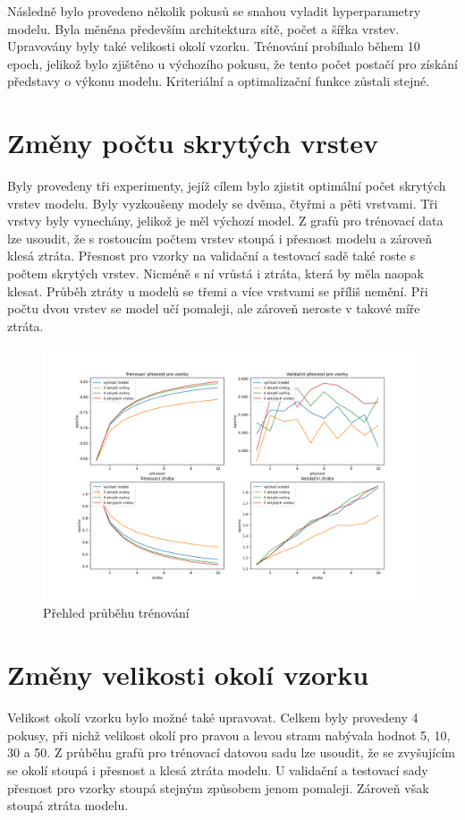 \documentclass[FM,BP]{tulthesis}
\begin{document}
Následně bylo provedeno několik pokusů se snahou vyladit hyperparametry modelu. Byla měněna především architektura sítě, počet a šířka vrstev. Upravovány byly také velikosti okolí vzorku. Trénování probíhalo během 10 epoch, jelikož bylo zjištěno u výchozího pokusu, že tento počet postačí pro získání představy o výkonu modelu. Kriteriální a optimalizační funkce zůstali stejné.

\section{Změny počtu skrytých vrstev}
Byly provedeny tři experimenty, jejíž cílem bylo zjistit optimální počet skrytých vrstev modelu. Byly vyzkoušeny modely se dvěma, čtyřmi a pěti vrstvami. Tři vrstvy byly vynechány, jelikož je měl výchozí model. Z grafů pro trénovací data lze usoudit, že s rostoucím počtem vrstev stoupá i přesnost modelu a zároveň klesá ztráta. Přesnost pro vzorky na validační a testovací sadě také roste s počtem skrytých vrstev. Nicméně s ní vrůstá i ztráta, která by měla naopak klesat. Průběh ztráty u modelů se třemi a více vrstvami se příliš nemění. Při počtu dvou vrstev se model učí pomaleji, ale zároveň neroste v takové míře ztráta.

\begin{figure}[!htbp]
\centerline{\includegraphics[scale=.5]{training_course-layers.png}}
\caption{Přehled průběhu trénování}
\label{fig}
\end{figure}
\FloatBarrier

\section{Změny velikosti okolí vzorku}
Velikost okolí vzorku bylo možné také upravovat. Celkem byly provedeny 4 pokusy, při nichž velikost okolí pro pravou a levou stranu nabývala hodnot 5, 10, 30 a 50. Z průběhu grafů pro trénovací datovou sadu lze usoudit, že se zvyšujícím se okolí stoupá i přesnost a klesá ztráta modelu. U validační a testovací sady přesnost pro vzorky stoupá stejným způsobem jenom pomaleji. Zároveň však stoupá ztráta modelu.
\end{document}
